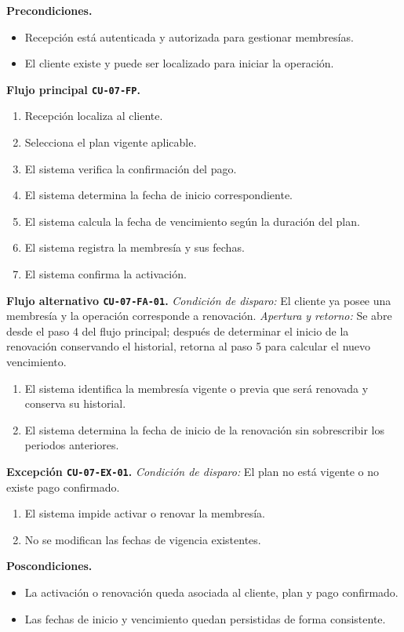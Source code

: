 \documentclass[11pt,a4paper,twoside]{article}
\begin{document}
\textbf{Precondiciones.}
\begin{itemize}
\item Recepción está autenticada y autorizada para gestionar membresías.
\item El cliente existe y puede ser localizado para iniciar la operación.
\end{itemize}

\textbf{Flujo principal \texttt{CU-07-FP}.}
\begin{enumerate}
\item Recepción localiza al cliente.
\item Selecciona el plan vigente aplicable.
\item El sistema verifica la confirmación del pago.
\item El sistema determina la fecha de inicio correspondiente.
\item El sistema calcula la fecha de vencimiento según la duración del plan.
\item El sistema registra la membresía y sus fechas.
\item El sistema confirma la activación.
\end{enumerate}

\textbf{Flujo alternativo \texttt{CU-07-FA-01}.} \textit{Condición de disparo:} El cliente ya posee una membresía y la operación corresponde a renovación. \textit{Apertura y retorno:} Se abre desde el paso 4 del flujo principal; después de determinar el inicio de la renovación conservando el historial, retorna al paso 5 para calcular el nuevo vencimiento.
\begin{enumerate}[label=\alph*.]
\item El sistema identifica la membresía vigente o previa que será renovada y conserva su historial.
\item El sistema determina la fecha de inicio de la renovación sin sobrescribir los periodos anteriores.
\end{enumerate}

\textbf{Excepción \texttt{CU-07-EX-01}.} \textit{Condición de disparo:} El plan no está vigente o no existe pago confirmado.
\begin{enumerate}[label=\alph*.]
\item El sistema impide activar o renovar la membresía.
\item No se modifican las fechas de vigencia existentes.
\end{enumerate}

\textbf{Poscondiciones.}
\begin{itemize}
\item La activación o renovación queda asociada al cliente, plan y pago confirmado.
\item Las fechas de inicio y vencimiento quedan persistidas de forma consistente.
\end{itemize}
\end{document}
